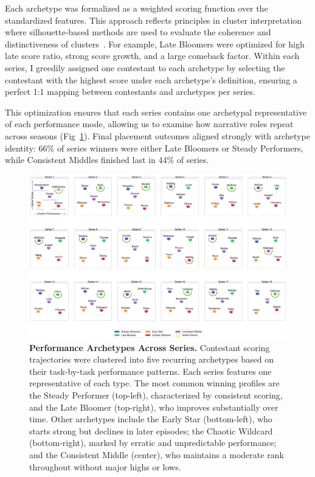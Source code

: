 \documentclass[10pt,letterpaper]{article}
\begin{document}
Each archetype was formalized as a weighted scoring function over the standardized features. This approach reflects principles in cluster interpretation where silhouette-based methods are used to evaluate the coherence and distinctiveness of clusters~\cite{Rousseeuw1987}. For example, Late Bloomers were optimized for high late score ratio, strong score growth, and a large comeback factor. Within each series, I greedily assigned one contestant to each archetype by selecting the contestant with the highest score under each archetype’s definition, ensuring a perfect 1:1 mapping between contestants and archetypes per series.

This optimization ensures that each series contains one archetypal representative of each performance mode, allowing us to examine how narrative roles repeat across seasons (Fig~\ref{fig:performance_archetypes}). Final placement outcomes aligned strongly with archetype identity: 66\% of series winners were either Late Bloomers or Steady Performers, while Consistent Middles finished last in 44\% of series.

\begin{figure}[!h]
\centering
\includegraphics[width=\linewidth]{figures/main/Fig7.png}
\caption{{\bf Performance Archetypes Across Series.}
Contestant scoring trajectories were clustered into five recurring archetypes based on their task-by-task performance patterns. Each series features one representative of each type. The most common winning profiles are the Steady Performer (top-left), characterized by consistent scoring, and the Late Bloomer (top-right), who improves substantially over time. Other archetypes include the Early Star (bottom-left), who starts strong but declines in later episodes; the Chaotic Wildcard (bottom-right), marked by erratic and unpredictable performance; and the Consistent Middle (center), who maintains a moderate rank throughout without major highs or lows.}
\label{fig:performance_archetypes}
\end{figure}
\FloatBarrier
\end{document}
